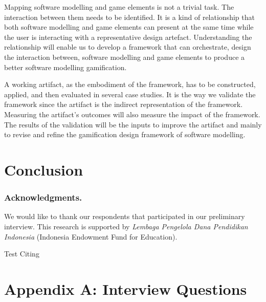 \documentclass[runningheads,a4paper]{llncs}
\begin{document}
Mapping software modelling and game elements is not a trivial task. The interaction between them needs to be identified. It is a kind of relationship that both software modelling and game elements can present at the same time while the user is interacting with a representative design artefact. Understanding the relationship will enable us to develop a framework that can orchestrate, design the interaction between, software modelling and game elements to produce a better software modelling gamification.

A working artifact, as the embodiment of the framework, has to be constructed, applied, and then evaluated in several case studies. It is the way we validate the framework since the artifact is the indirect representation of the framework. Measuring the artifact’s outcomes will also measure the impact of the framework. The results of the validation will be the inputs to improve the artifact and mainly to revise and refine the gamification design framework of software modelling.

\section{Conclusion}
 

\subsubsection*{Acknowledgments.} We would like to thank our respondents that participated in our preliminary interview. This research is supported by \emph{Lembaga Pengelola Dana Pendidikan Indonesia} (Indonesia Endowment Fund for Education). 

Test Citing \cite{deterding2011game}

 





\section*{Appendix A: Interview Questions}
\end{document}
